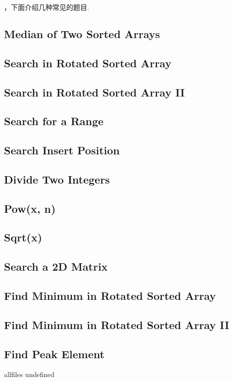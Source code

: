 \documentclass{article}
\begin{document}
\begin{CJK}{UTF8}{gbsn}     %

\else
    
，下面介绍几种常见的题目.
\\
\fi
\subsection{Median of Two Sorted Arrays}

\subsection{Search in Rotated Sorted Array}

\subsection{Search in Rotated Sorted Array II}

\subsection{Search for a Range}

\subsection{Search Insert Position}

\subsection{Divide Two Integers}

\subsection{Pow(x, n)}

\subsection{Sqrt(x)}

\subsection{Search a 2D Matrix}

\subsection{Find Minimum in Rotated Sorted Array}

\subsection{Find Minimum in Rotated Sorted Array II}

\subsection{Find Peak Element}


\ifx allfiles undefined
\end{CJK}
\end{document}
